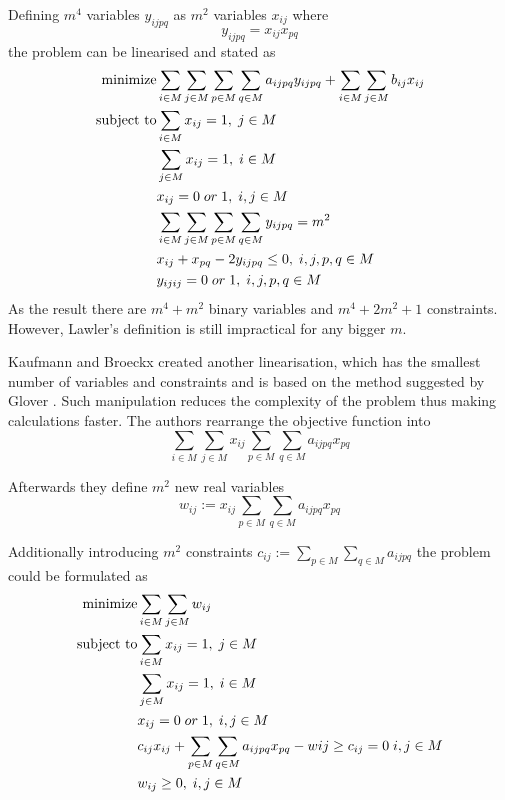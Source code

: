 Defining $m^4$ variables $y_{ijpq}$ as $m^2$ variables $x_{ij}$ where
\begin{equation}
y_{ijpq} = x_{ij}x_{pq}
\end{equation}
the problem can be linearised and stated as
\begin{align}
  \text{minimize} &\null \sum_{i \in M} \sum_{j \in M} \sum_{p \in M} \sum_{q \in M} a_{ijpq}y_{ijpq} + \sum_{i \in M} \sum_{j \in M} b_{ij} x_{ij} \\
  \text{subject to} &\null \sum_{i \in M} x_{ij} = 1, \; j \in M \\
  &\null \sum_{j \in M} x_{ij} = 1, \; i \in M \\
  &\null x_{ij} = 0 \; or \; 1, \; i, j \in M \\
  &\null \sum_{i \in M} \sum_{j \in M} \sum_{p \in M} \sum_{q \in M} y_{ijpq} = m^2 \; \\
  &\null x_{ij} + x_{pq} - 2y_{ijpq} \leq 0, \; i, j, p, q \in M \\
  &\null y_{ijij} = 0 \; or \; 1, \; i, j, p, q \in M \\
\end{align}
As the result there are $m^4 + m^2$ binary variables and $m^4 + 2 m^2 + 1$ constraints. However, Lawler's definition is still impractical for any bigger $m$.

Kaufmann and Broeckx \cite{kaufman1978algorithm} created another linearisation, which has the smallest number of variables and constraints and is based on the method suggested by Glover \cite{gueye2009linearization}.
Such manipulation reduces the complexity of the problem thus making calculations faster.
The authors rearrange the objective function into
\begin{equation}
  \sum_{i \in M} \sum_{j \in M} x_{ij} \sum_{p \in M} \sum_{q \in M} a_{ijpq} x_{pq}
\end{equation}

Afterwards they define $m^2$ new real variables
\begin{equation}
  w_{ij} := x_{ij}\sum_{p \in M} \sum_{q \in M} a_{ijpq} x_{pq}
\end{equation}

Additionally introducing $m^2$ constraints $ c_{ij} := \sum_{p \in M} \sum_{q \in M} a_{ijpq} $ the problem could be formulated as
\begin{align}
  \text{minimize} &\null \sum_{i \in M} \sum_{j \in M} w_{ij}\\
  \text{subject to} &\null \sum_{i \in M} x_{ij} = 1, \; j \in M \\
  &\null \sum_{j \in M} x_{ij} = 1, \; i \in M \\
  &\null x_{ij} = 0 \; or \; 1, \; i, j \in M \\
  &\null c_{ij}x_{ij} + \sum_{p \in M} \sum_{q \in M} a_{ijpq}x_{pq} - w{ij} \geq c_{ij} = 0 \; i, j \in M \\
  &\null w_{ij} \geq 0, \; i, j \in M \\
\end{align}

